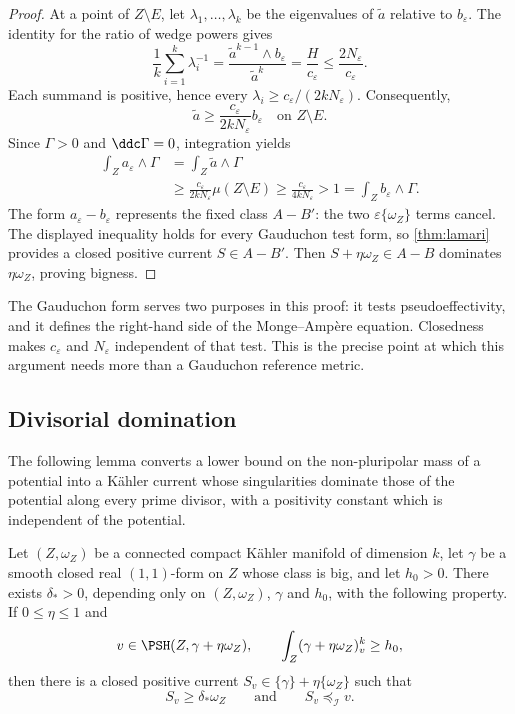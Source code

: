 \begin{proof}
At a point of $Z\setminus E$, let $\lambda_1,\ldots,\lambda_k$ be
the eigenvalues of $\widetilde a$ relative to $b_\varepsilon$. The
identity for the ratio of wedge powers gives
\[
 \frac1k\sum_{i=1}^k\lambda_i^{-1}
 =\frac{\widetilde a^{k-1}\wedge b_\varepsilon}{\widetilde a^k}
 =\frac{H}{c_\varepsilon}
 \leq\frac{2N_\varepsilon}{c_\varepsilon}.
\]
Each summand is positive, hence every
$\lambda_i\geq c_\varepsilon/(2kN_\varepsilon)$. Consequently,
\[
 \widetilde a\geq
 \frac{c_\varepsilon}{2kN_\varepsilon}b_\varepsilon
 \quad\text{on }Z\setminus E.
\]
Since $\Gamma>0$ and $\ddc\Gamma=0$, integration yields
\[
 \begin{split}
 \int_Z a_\varepsilon\wedge\Gamma
 &=\int_Z\widetilde a\wedge\Gamma\\
 &\geq\frac{c_\varepsilon}{2kN_\varepsilon}\mu(Z\setminus E)
 \geq\frac{c_\varepsilon}{4kN_\varepsilon}>1
 =\int_Zb_\varepsilon\wedge\Gamma.
 \end{split}
\]
The form $a_\varepsilon-b_\varepsilon$ represents the fixed class
$A-B'$: the two $\varepsilon\{\omega_Z\}$ terms cancel. The displayed
inequality holds for every Gauduchon test form, so \cref{thm:lamari}
provides a closed positive current $S\in A-B'$. Then
$S+\eta\omega_Z\in A-B$ dominates $\eta\omega_Z$, proving bigness.
\end{proof}

The Gauduchon form serves two purposes in this proof: it tests
pseudoeffectivity, and it defines the right-hand side of the
Monge--Amp\`ere equation. Closedness makes $c_\varepsilon$ and
$N_\varepsilon$ independent of that test. This is the precise point
at which this argument needs more than a Gauduchon reference metric.

\subsection{Divisorial domination}

The following lemma converts a lower bound on the non-pluripolar mass of a
potential into a K\"ahler current whose singularities dominate those of the
potential along every prime divisor, with a positivity constant which is
independent of the potential.

\begin{lemma}\label{nk:lem:domination}
Let $(Z,\omega_Z)$ be a connected compact K\"ahler manifold of
dimension $k$, let
$\gamma$ be a smooth closed real $(1,1)$-form on $Z$ whose class is
big, and let $h_0>0$. There exists $\delta_*>0$, depending only on
$(Z,\omega_Z)$, $\gamma$ and $h_0$, with the following property. If
$0\le\eta\le1$ and
\begin{equation}\label{nk:eq:dom-hyp}
  v\in\PSH(Z,\gamma+\eta\omega_Z),\qquad
  \int_Z(\gamma+\eta\omega_Z)_v^k\ge h_0,
\end{equation}
then there is a closed positive current
$S_v\in\{\gamma\}+\eta\{\omega_Z\}$ such that
\begin{equation}\label{nk:eq:dom-concl}
  S_v\ge\delta_*\omega_Z
  \qquad\text{and}\qquad S_v\preceq_{\mathcal I} v.
\end{equation}
\end{lemma}

